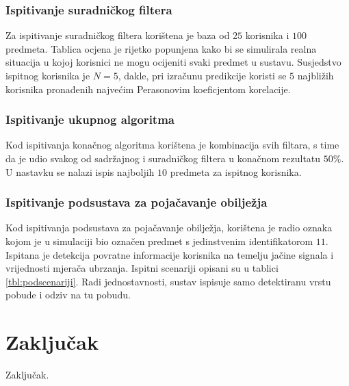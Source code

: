 \documentclass[times, utf8, diplomski, numeric]{fer}
\begin{document}


\subsection{Ispitivanje suradničkog filtera}
Za ispitivanje suradničkog filtera korištena je baza od $25$ korisnika i $100$
predmeta. Tablica ocjena je rijetko popunjena kako bi se simulirala realna
situacija u kojoj korisnici ne mogu ocijeniti svaki predmet u sustavu.
Susjedstvo ispitnog korisnika je $N = 5$, dakle, pri izračunu predikcije koristi
se $5$ najbližih korisnika pronađenih najvećim Perasonovim koeficjentom
korelacije.



\subsection{Ispitivanje ukupnog algoritma}
Kod ispitivanja konačnog algoritma korištena je kombinacija svih filtara, s time
da je udio svakog od sadržajnog i suradničkog filtera u konačnom rezultatu
$50\%$. U nastavku se nalazi ispis najboljih $10$ predmeta za ispitnog
korisnika.

 
	
\subsection{Ispitivanje podsustava za pojačavanje obilježja}
Kod ispitivanja podsustava za pojačavanje obilježja, korištena je radio oznaka
kojom je u simulaciji bio označen predmet s jedinstvenim identifikatorom $11$.
Ispitana je detekcija povratne informacije korisnika na temelju jačine signala i
vrijednosti mjerača ubrzanja. Ispitni scenariji opisani su u tablici
\ref{tbl:podscenariji}. Radi jednostavnosti, sustav ispisuje samo detektiranu
vrstu pobude i odziv na tu pobudu.



\chapter{Zaključak}
Zaključak.
\end{document}

